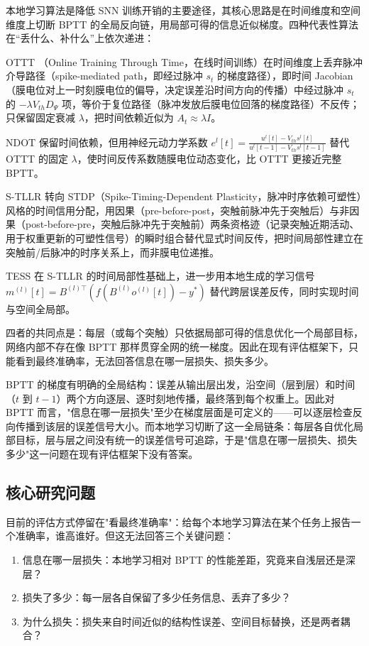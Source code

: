 \documentclass[journal,12pt,onecolumn]{IEEEtran}
\begin{document}
本地学习算法是降低 SNN 训练开销的主要途径，其核心思路是在时间维度和空间维度上切断 BPTT 的全局反向链，用局部可得的信息近似梯度。四种代表性算法在“丢什么、补什么”上依次递进：

OTTT \cite{xiao_online_2022}（Online Training Through Time，在线时间训练）在时间维度上丢弃脉冲介导路径（spike-mediated path，即经过脉冲 $s_t$ 的梯度路径），即时间 Jacobian（膜电位对上一时刻膜电位的偏导，决定误差沿时间方向的传播）中经过脉冲 $s_t$ 的 $-\lambda V_{th}D_\Psi$ 项，等价于复位路径（脉冲发放后膜电位回落的梯度路径）不反传；只保留固定衰减 $\lambda$，把时间依赖近似为 $A_t\approx\lambda I$。

NDOT \cite{jiang_ndot_nodate} 保留时间依赖，但用神经元动力学系数 $e^l[t]=\frac{u^l[t]-V_{th}s^l[t]}{u^l[t-1]-V_{th}s^l[t-1]}$ 替代 OTTT 的固定 $\lambda$，使时间反传系数随膜电位动态变化，比 OTTT 更接近完整 BPTT。

S-TLLR \cite{apolinario_s-tllr_2024} 转向 STDP（Spike-Timing-Dependent Plasticity，脉冲时序依赖可塑性）风格的时间信用分配，用因果（pre-before-post，突触前脉冲先于突触后）与非因果（post-before-pre，突触后脉冲先于突触前）两条资格迹（记录突触近期活动、用于权重更新的可塑性信号）的瞬时组合替代显式时间反传，把时间局部性建立在突触前/后脉冲的时序关系上，而非膜电位递推。

TESS \cite{apolinario_tess_2025} 在 S-TLLR 的时间局部性基础上，进一步用本地生成的学习信号 $m^{(l)}[t]=B^{(l)\top}(f(B^{(l)}o^{(l)}[t])-y^*)$ 替代跨层误差反传，同时实现时间与空间全局部。

四者的共同点是：每层（或每个突触）只依据局部可得的信息优化一个局部目标，网络内部不存在像 BPTT 那样贯穿全网的统一梯度。因此在现有评估框架下，只能看到最终准确率，无法回答信息在哪一层损失、损失多少。

BPTT 的梯度有明确的全局结构：误差从输出层出发，沿空间（层到层）和时间（$t$ 到 $t-1$）两个方向逐层、逐时刻地传播，最终落到每个权重上。因此对 BPTT 而言，"信息在哪一层损失"至少在梯度层面是可定义的——可以逐层检查反向传播到该层的误差信号大小。而本地学习切断了这一全局链条：每层各自优化局部目标，层与层之间没有统一的误差信号可追踪，于是"信息在哪一层损失、损失多少"这一问题在现有评估框架下没有答案。

\subsection{核心研究问题}

目前的评估方式停留在"看最终准确率"：给每个本地学习算法在某个任务上报告一个准确率，谁高谁好。但这无法回答三个关键问题：

\begin{enumerate}[leftmargin=1.5em,itemsep=0pt]
\item 信息在哪一层损失：本地学习相对 BPTT 的性能差距，究竟来自浅层还是深层？
\item 损失了多少：每一层各自保留了多少任务信息、丢弃了多少？
\item 为什么损失：损失来自时间近似的结构性误差、空间目标替换，还是两者耦合？
\end{enumerate}
\end{document}
